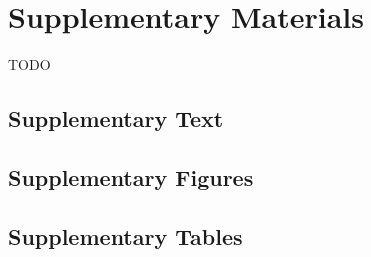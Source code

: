 \documentclass[smallextended]{svjour3}
\begin{document}
\section*{Supplementary Materials}
TODO

\subsection*{Supplementary Text}\label{ss:supp}




\subsection*{Supplementary Figures}\label{ss:sfig}

\subsection*{Supplementary Tables}\label{ss:stab}
\end{document}
